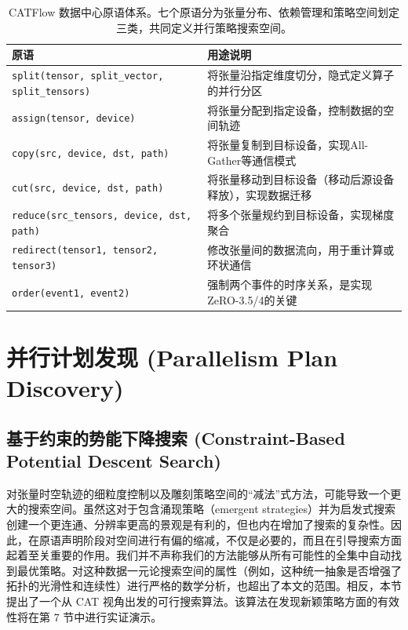 \begin{table}[!t]
    \centering
    \caption{CATFlow 数据中心原语体系。七个原语分为张量分布、依赖管理和策略空间划定三类，共同定义并行策略搜索空间。}
    \label{tab:catflow-primitives}
    \begin{tabular}{p{} p{}}
        \toprule
        \textbf{原语} & \textbf{用途说明} \\
        \midrule
        \texttt{split(tensor, split\_vector, split\_tensors)} & 将张量沿指定维度切分，隐式定义算子的并行分区 \\
        \texttt{assign(tensor, device)} & 将张量分配到指定设备，控制数据的空间轨迹 \\
        \texttt{copy(src, device, dst, path)} & 将张量复制到目标设备，实现All-Gather等通信模式 \\
        \texttt{cut(src, device, dst, path)} & 将张量移动到目标设备（移动后源设备释放），实现数据迁移 \\
        \texttt{reduce(src\_tensors, device, dst, path)} & 将多个张量规约到目标设备，实现梯度聚合 \\
        \texttt{redirect(tensor1, tensor2, tensor3)} & 修改张量间的数据流向，用于重计算或环状通信 \\
        \texttt{order(event1, event2)} & 强制两个事件的时序关系，是实现ZeRO-3.5/4的关键 \\
        \bottomrule
    \end{tabular}
\end{table}


\section{并行计划发现 (Parallelism Plan Discovery)}

\subsection{基于约束的势能下降搜索 (Constraint-Based Potential Descent Search)}

对张量时空轨迹的细粒度控制以及雕刻策略空间的“减法”式方法，可能导致一个更大的搜索空间。虽然这对于包含涌现策略（emergent strategies）并为启发式搜索创建一个更连通、分辨率更高的景观是有利的，但也内在增加了搜索的复杂性。因此，在原语声明阶段对空间进行有偏的缩减，不仅是必要的，而且在引导搜索方面起着至关重要的作用。我们并不声称我们的方法能够从所有可能性的全集中自动找到最优策略。对这种数据一元论搜索空间的属性（例如，这种统一抽象是否增强了拓扑的光滑性和连续性）进行严格的数学分析，也超出了本文的范围。相反，本节提出了一个从 CAT 视角出发的可行搜索算法。该算法在发现新颖策略方面的有效性将在第 7 节中进行实证演示。

